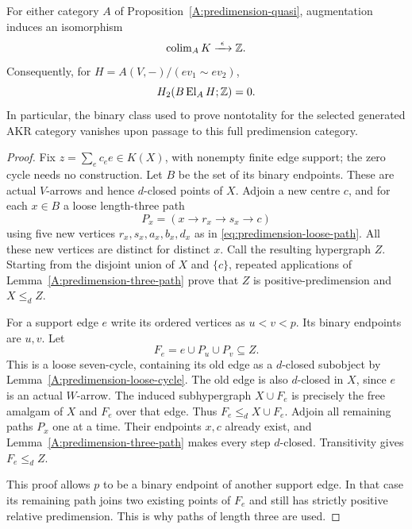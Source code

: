 \begin{proposition}
\label{A:predimension-binary-colimit}
For either category $A$ of
Proposition~\ref{A:predimension-quasi}, augmentation induces an
isomorphism
\[
 \operatorname{colim}_A K\xrightarrow{\ \epsilon\ }\Z.
\]
Consequently, for
$H=A(V,-)/(ev_1\sim ev_2)$,
\[
 H_2(B\operatorname{El}_A H;\mathbb Z)=0.
\]
In particular, the binary class used to prove nontotality for the
selected generated AKR category vanishes upon passage to this full
predimension category.
\end{proposition}
\begin{proof}
Fix $z=\sum_e c_e e\in K(X)$, with nonempty finite edge support;
the zero cycle needs no construction. Let $B$ be the set of its
binary endpoints. These are actual $V$-arrows and hence $d$-closed
points of $X$. Adjoin a new centre $c$, and for each $x\in B$ a
loose length-three path
\[
 P_x=(x\longrightarrow r_x\longrightarrow s_x\longrightarrow c)
\]
using five new vertices $r_x,s_x,a_x,b_x,d_x$ as in
\eqref{eq:predimension-loose-path}. All these new vertices are
distinct for distinct $x$. Call the resulting hypergraph $Z$.
Starting from the disjoint union of $X$ and $\{c\}$, repeated
applications of Lemma~\ref{A:predimension-three-path} prove that
$Z$ is positive-predimension and $X\leq_d Z$.

For a support edge $e$ write its ordered vertices as $u<v<p$.
Its binary endpoints are $u,v$. Let
\[
 F_e=e\cup P_u\cup P_v\subseteq Z.
\]
This is a loose seven-cycle, containing its old edge as a
$d$-closed subobject by Lemma~\ref{A:predimension-loose-cycle}.
The old edge is also $d$-closed in $X$, since $e$ is an actual
$W$-arrow. The induced subhypergraph $X\cup F_e$ is precisely the
free amalgam of $X$ and $F_e$ over that edge. Thus
$F_e\leq_d X\cup F_e$. Adjoin all remaining paths $P_x$ one at
a time. Their endpoints $x,c$ already exist, and
Lemma~\ref{A:predimension-three-path} makes every step $d$-closed.
Transitivity gives $F_e\leq_d Z$.

This proof allows $p$ to be a binary endpoint of another support
edge. In that case its remaining path joins two existing points
of $F_e$ and still has strictly positive relative predimension.
This is why paths of length three are used.


\end{proof}

